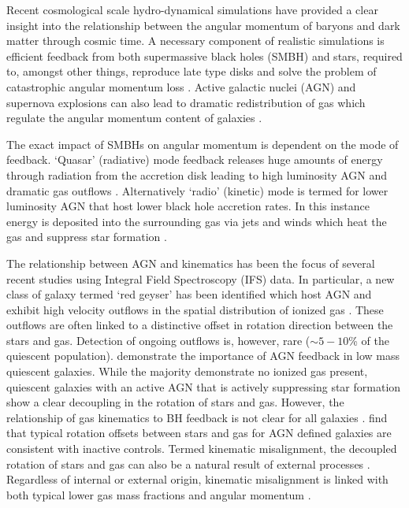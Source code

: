 \documentclass[fleqn,usenatbib]{mnras}
\begin{document}
Recent cosmological scale hydro-dynamical simulations have provided a clear insight into the relationship between the angular momentum of baryons and dark matter through cosmic time. A necessary component of realistic simulations is efficient feedback from both supermassive black holes (SMBH) and stars, required to, amongst other things, reproduce late type disks and solve the problem of catastrophic angular momentum loss \citep[e.g.][]{zavala2008, scannapieco2009}. Active galactic nuclei (AGN) and supernova explosions can also lead to dramatic redistribution of gas which regulate the angular momentum content of galaxies \citep[e.g.][]{genel2015, DeFelippis2017}. 

The exact impact of SMBHs on angular momentum is dependent on the mode of feedback. `Quasar' (radiative) mode feedback releases huge amounts of energy through radiation from the accretion disk leading to high luminosity AGN and dramatic gas outflows \citep[e.g.][]{cattaneo2009, rubin2014, cheung2016}. Alternatively `radio' (kinetic) mode is termed for lower luminosity AGN that host lower black hole accretion rates. In this instance energy is deposited into the surrounding gas via jets and winds which heat the gas and suppress star formation \citep[][]{binney1995, ciotti2001, heckman2014}.

The relationship between AGN and kinematics has been the focus of several recent studies using Integral Field Spectroscopy (IFS) data. In particular, a new class of galaxy termed `red geyser' has been identified which host AGN and exhibit high velocity outflows in the spatial distribution of ionized gas \citep[][]{cheung2016, roy2018}. These outflows are often linked to a distinctive offset in rotation direction between the stars and gas. Detection of ongoing outflows is, however, rare ($\sim5-10$\% of the quiescent population). \citet{penny2018} demonstrate the importance of AGN feedback in low mass quiescent galaxies. While the majority demonstrate no ionized gas present, quiescent galaxies with an active AGN that is actively suppressing star formation show a clear decoupling in the rotation of stars and gas. However, the relationship of gas kinematics to BH feedback is not clear for all galaxies \citep[see also:][]{koudmani2019}. \citet{ilha2019} find that typical rotation offsets between stars and gas for AGN defined galaxies are consistent with inactive controls. Termed kinematic misalignment, the decoupled rotation of stars and gas can also be a natural result of external processes \cite[e.g.][]{davis2011, barrera2015, vdvoort2015, jin2016, duckworth2019_halo}. Regardless of internal or external origin, kinematic misalignment is linked with both typical lower gas mass fractions and angular momentum \citep[e.g.][]{duckworth2019,starkenburg+19}. 
\end{document}
